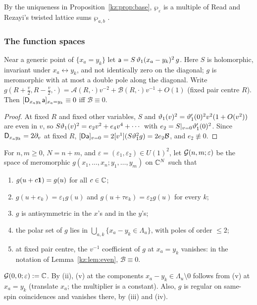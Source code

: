 \begin{remark}
By the uniqueness in Proposition~\ref{kz:prop:base}, $\wp_\varepsilon$ is a multiple of Read and Rezayi's twisted lattice
sums $\wp_{a,b}$ \cite[eq.~(80)]{RR96}.
\end{remark}

\subsubsection{The function spaces}

\begin{lemma}\label{kz:lem:even}
Near a generic point of $\{x_a=y_k\}$ let $\mathsf a=S\,\vartheta_1(x_a-y_k)^2\,g$. Here $S$ is holomorphic,
invariant under $x_a\leftrightarrow y_k$, and not identically zero on the diagonal; $g$ is meromorphic with at most
a double pole along the diagonal. Write
$g(R+\tfrac v2,R-\tfrac v2,\cdot)=\mathcal A(R,\cdot)v^{-2}+\mathcal B(R,\cdot)v^{-1}+O(1)$ (fixed pair
centre $R$). Then $[\mathsf{D}_{x_ay_k}\mathsf a]_{x_a=y_k}\equiv0$ iff $\mathcal B\equiv0$.
\end{lemma}

\begin{proof}
At fixed $R$ and fixed other variables, $S$ and $\vartheta_1(v)^2=\vartheta_1'(0)^2v^2(1+O(v^2))$ are even in $v$, so
$S\vartheta_1(v)^2=e_2v^2+e_4v^4+\cdots$ with $e_2=S|_{v=0}\vartheta_1'(0)^2$. Since $\mathsf{D}_{x_ay_k}=2\partial_v$ at fixed $R$,
$[\mathsf{D}\mathsf a]_{v=0}=2[v^1](S\vartheta_1^2g)=2e_2\mathcal B$, and $e_2\not\equiv0$.
\end{proof}

\begin{definition}\label{kz:def:G}
For $n,m\ge0$, $N=n+m$, and $\varepsilon=(\varepsilon_1,\varepsilon_2)\in U(1)^2$, let $\mathcal{G}(n,m;\varepsilon)$ be the space of meromorphic
$g(x_1,\dots,x_n;y_1,\dots,y_m)$ on $\mathbb{C}^N$ such that
\begin{enumerate}
\item[(i)] $g(u+c\mathbf{1})=g(u)$ for all $c\in\mathbb{C}$;
\item[(ii)] $g(u+e_k)=\varepsilon_1g(u)$ and $g(u+\tau e_k)=\varepsilon_2g(u)$ for every $k$;
\item[(iii)] $g$ is antisymmetric in the $x$'s and in the $y$'s;
\item[(iv)] the polar set of $g$ lies in $\bigcup_{a,k}\{x_a-y_k\in\Lambda_u\}$, with poles of order $\le2$;
\item[(v)] at fixed pair centre, the $v^{-1}$ coefficient of $g$ at $x_a=y_k$ vanishes: in the notation of
Lemma~\ref{kz:lem:even}, $\mathcal B\equiv0$.
\end{enumerate}
$\mathcal{G}(0,0;\varepsilon):=\mathbb{C}$. By (ii), (v) at the components $x_a-y_k\in\Lambda_u\setminus0$ follows from (v) at $x_a=y_k$
(translate $x_a$; the multiplier is a constant). Also, $g$ is regular on same-spin coincidences and vanishes
there, by (iii) and (iv).
\end{definition}

